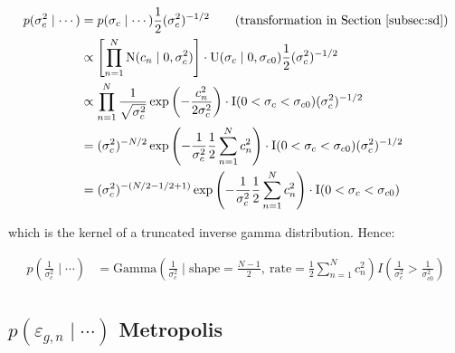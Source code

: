 \documentclass{article}\usepackage{graphicx, color}
\providecommand{\e}{\varepsilon}
\begin{document}
\begin{flushleft}
\begin{align*}
p( \sigma_c^2 \mid \cdots) &= p(\sigma_c \mid \cdots) \frac{1}{2} (\sigma_c^2)^{-1/2} \qquad \text{(transformation in Section \ref{subsec:sd})} \\
 &\propto \left [ \prod_{n = 1}^N \text{N}(c_n \mid 0, \sigma_c^2) \right ] \cdot \text{U}(\sigma_c \mid 0, \sigma_{c0}) \frac{1}{2} (\sigma_c^2)^{-1/2} \\
    &\propto \prod_{n = 1}^N \frac{1}{\sqrt{\sigma_c^2 }}\exp \left (- \frac{c_n^2}{2 \sigma_c^2} \right )\cdot \text{I}(0 < \sigma_c < \sigma_{c0}) (\sigma_c^2)^{-1/2}\\
    &= (\sigma_c^2)^{-N/2} \exp \left ( - \frac{1}{\sigma_c^2}\frac{1}{2 } \sum_{n = 1}^N c_n^2 \right )\cdot \text{I}(0 < \sigma_c < \sigma_{c0}) (\sigma_c^2)^{-1/2} \\
&= (\sigma_c^2)^{-(N/2 -1/2 + 1)} \exp \left ( - \frac{1}{\sigma_c^2}\frac{1}{2 } \sum_{n = 1}^N c_n^2 \right )\cdot \text{I}(0 < \sigma_c < \sigma_{c0}) \\
 \end{align*}
 
which is the kernel of a truncated inverse gamma distribution. Hence:

\begin{align*}
p \left ( \frac{1}{\sigma_c^2} \mid \cdots \right) &= \text{Gamma} \left ( \frac{1}{\sigma_c^2} \mid \text{shape} = \frac{N - 1}{2}, \ \text{rate} =\frac{1}{2} {\sum_{n = 1}^N c_n^2} \right )  I \left (\frac{1}{\sigma_c^2} > \frac{1}{\sigma_{c0}^2} \right ) \\
\end{align*}

 
 
 
 
 
 
 
 
 
 
 
 
 
\subsection{ $p(\e_{g, n} \mid \cdots)$ Metropolis}
 

\end{flushleft}
\end{document}
